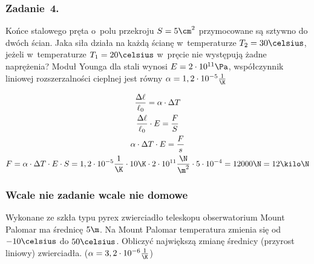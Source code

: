 \subsubsection*{Zadanie~4.}
\begin{statement}
    Końce stalowego pręta o~polu przekroju \(S = 5\cm^2\) przymocowane są sztywno do dwóch ścian. Jaka siła działa na każdą ścianę w~temperaturze \(T_2 = 30\celsius\), jeżeli w~temperaturze \(T_1 = 20\celsius\) w~pręcie nie występują żadne naprężenia? Moduł Younga dla stali wynosi \(E = 2 \cdot 10^{11}\Pa\), współczynnik liniowej rozszerzalności cieplnej jest równy \(\alpha = 1,2 \cdot 10^{-5}\frac{1}{\K}\)
\end{statement}
\begin{gather*}
    \frac{\Delta \ell}{\ell_0} = \alpha \cdot \Delta T\\
    \frac{\Delta \ell}{\ell_0} \cdot E = \frac{F}{S}\\
    \alpha \cdot \Delta T \cdot E = \frac{F}{s}\\
    F = \alpha \cdot \Delta T \cdot E \cdot S
        = 1,2 \cdot 10^{-5}\frac{1}{\K} \cdot 10\K \cdot 2 \cdot 10^{11} \frac{\N}{\m^2} \cdot 5 \cdot 10^{-4}
        = 12000\N
        = 12\kilo\N
\end{gather*}
\subsubsection*{Wcale nie zadanie wcale nie domowe}
\begin{statement}
    Wykonane ze szkła typu pyrex zwierciadło teleskopu obserwatorium Mount Palomar ma średnicę \(5\m\). Na Mount Palomar temperatura zmienia się od \(-10\celsius\) do \(50\celsius\). Obliczyć największą zmianę średnicy (przyrost liniowy) zwierciadła. (\(\alpha = 3,2 \cdot 10^{-6}\frac{1}{\K}\))
\end{statement}